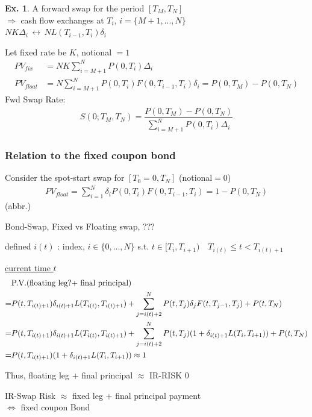 \documentclass[a4paper,11pt]{jsarticle}
\theoremstyle{definition}
\newtheorem{ex}{Ex.}[subsection]
\newcommand{\df}[2]{\dfrac{#1}{#2}}
\begin{document}
\begin{ex}
  A forward swap for the period $[T_M,T_N]$ \\
  $\Rightarrow$ cash flow exchanges
  at $T_i, \, i=\{M+1, ..., N\} $ \\
  $NK\Delta_i \, \leftrightarrow \, NL(T_{i-1},T_i)\delta_i$

  Let fixed rate be $K$, notional $=1$
  \begin{align}
    PV_{fix}&=NK\sum_{i=M+1}^N P(0,T_i)\Delta_i \\
    PV_{float}&=N\sum_{i=M+1}^N P(0,T_i)F(0,T_{i-1},T_i)
    \delta_i = P(0,T_M)-P(0,T_N)
  \end{align}
  Fwd Swap Rate:
  \begin{align}
    S(0;T_M,T_N)
    =\df{P(0,T_M)-P(0,T_N)}{\sum_{i=M+1}^N P(0,T_i)\Delta_i}
  \end{align}
\end{ex}


\subsubsection{Relation to the fixed coupon bond}
Consider the spot-start swap for $[T_0=0, T_N]$ (notional$=0$)
\begin{align}
  PV_{float}=\sum_{i=1}^N \delta_i P(0,T_i)F(0,T_{i-1},T_i)
  =1-P(0,T_N)
\end{align}
(abbr.)


Bond-Swap, Fixed vs Floating swap, 
???

defined $i(t)$ : index, $i\in\{0,...,N\} $
s.t. $t\in[T_i,T_{i+1}) \quad T_{i(t)}\leq t < T_{i(t)+1}$

\underline{current time $t$}
\begin{align}
  &\mbox{P.V.(floating leg?+ final principal)} \notag \\
  =&P(t,T_{i(t)+1})\delta_{i(t)+1}L(T_{i(t)},T_{i(t)+1})
  +\sum_{j=i(t)+2}^N P(t,T_j)\delta_j F(t,T_{j-1},T_j)
  +P(t,T_N) \notag \\
  =&P(t,T_{i(t)+1})\delta_{i(t)+1}L(T_{i(t)},T_{i(t)+1})
  +\sum_{j=i(t)+2}^N P(t,T_j)(1+\delta_{i(t)+1}L(T_i,T_{i+1}))
  +P(t,T_N) \notag \\
  =&P(t,T_{i(t)+1})(1+\delta_{i(t)+1}L(T_i,T_{i+1}))
  \approx 1
\end{align}

Thus, floating leg + final principal $\approx$ IR-RISK $0$

IR-Swap Risk $\approx$ fixed leg + final principal payment \\
$\Leftrightarrow$ fixed coupon Bond
\end{document}
